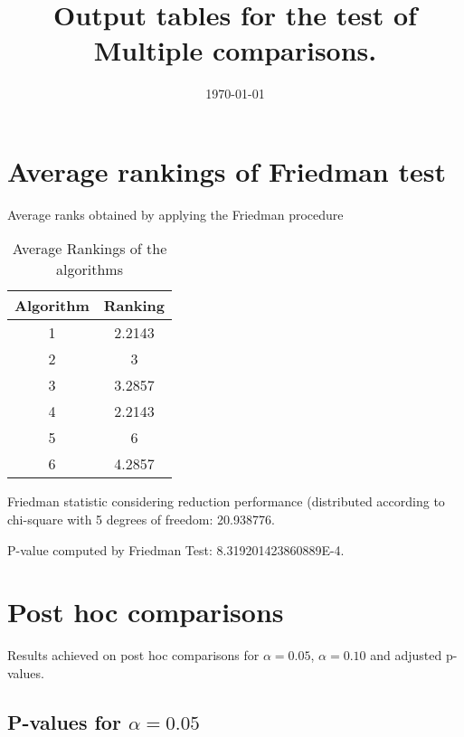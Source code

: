 \documentclass[a4paper,10pt]{article}
\title{Output tables for the test of Multiple comparisons.}
\author{}
\date{\today}
\begin{document}
\begin{landscape}
\pagestyle{empty}
\maketitle
\thispagestyle{empty}
\section{Average rankings of Friedman test}



Average ranks obtained by applying the Friedman procedure

\begin{table}[!htp]
\centering
\begin{tabular}{|c|c|}\hline
Algorithm&Ranking\\\hline
1 & 2.2143\\
2 & 3\\
3 & 3.2857\\
4 & 2.2143\\
5 & 6\\
6 & 4.2857\\
\hline
\end{tabular}
\caption{Average Rankings of the algorithms}
\end{table}

Friedman statistic considering reduction performance (distributed according to chi-square with 5 degrees of freedom: 20.938776.

P-value computed by Friedman Test: 8.319201423860889E-4.\newline



\pagebreak

\section{Post hoc comparisons}

Results achieved on post hoc comparisons for $\alpha = 0.05$, $\alpha = 0.10$ and adjusted p-values.

\subsection{P-values for $\alpha=0.05$}


\end{landscape}
\end{document}

